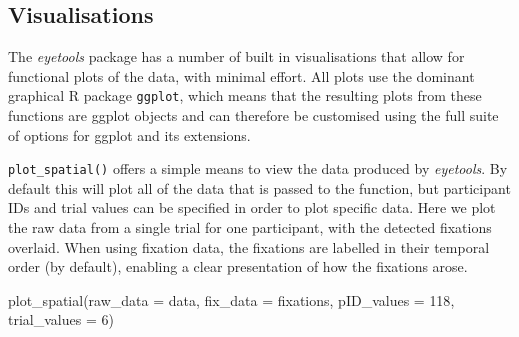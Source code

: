 \documentclass[
  man,
  floatsintext,
  longtable,
  nolmodern,
  notxfonts,
  notimes,
  colorlinks=true,linkcolor=blue,citecolor=blue,urlcolor=blue]{apa7}
\newenvironment{Shaded}{\begin{snugshade}}{\end{snugshade}}
\newcommand{\AttributeTok}[1]{\textcolor[rgb]{0.40,0.45,0.13}{#1}}
\newcommand{\DecValTok}[1]{\textcolor[rgb]{0.68,0.00,0.00}{#1}}
\newcommand{\FunctionTok}[1]{\textcolor[rgb]{0.28,0.35,0.67}{#1}}
\newcommand{\NormalTok}[1]{\textcolor[rgb]{0.00,0.23,0.31}{#1}}
\begin{document}
\subsection{Visualisations}\label{visualisations}

The \emph{eyetools} package has a number of built in visualisations that
allow for functional plots of the data, with minimal effort. All plots
use the dominant graphical R package \texttt{ggplot}, which means that
the resulting plots from these functions are ggplot objects and can
therefore be customised using the full suite of options for ggplot and
its extensions.

\texttt{plot\_spatial()} offers a simple means to view the data produced
by \emph{eyetools}. By default this will plot all of the data that is
passed to the function, but participant IDs and trial values can be
specified in order to plot specific data. Here we plot the raw data from
a single trial for one participant, with the detected fixations
overlaid. When using fixation data, the fixations are labelled in their
temporal order (by default), enabling a clear presentation of how the
fixations arose.

\begin{Shaded}
\begin{Highlighting}[]
\FunctionTok{plot\_spatial}\NormalTok{(}\AttributeTok{raw\_data =}\NormalTok{ data,}
             \AttributeTok{fix\_data =}\NormalTok{ fixations,}
             \AttributeTok{pID\_values =} \DecValTok{118}\NormalTok{,}
             \AttributeTok{trial\_values =} \DecValTok{6}\NormalTok{)}
\end{Highlighting}
\end{Shaded}
\end{document}
